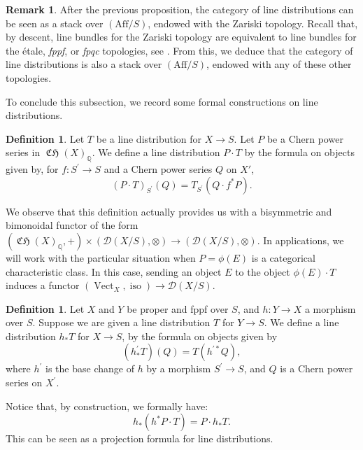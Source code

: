 \documentclass[JEP,XML,SOM,Unicode,published]{cedram}
\theoremstyle{plain}
\theoremstyle{definition}
\newtheorem{definition}[theorem]{Definition}
\newtheorem{remark}[theorem]{Remark}
\newcommand{\QBbb}{\mathbb Q}
\newcommand{\Dcal}{\mathcal D}
\newcommand{\fppf}{\emph{fppf}\xspace}
\DeclareMathOperator{\CHfrak}{\mathfrak{CH}}
\DeclareMathOperator{\iso}{iso}
\DeclareMathOperator{\Vect}{Vect}
\begin{document}
\begin{remark}
After the previous proposition, the category of line distributions can be seen as a stack over $(\mathrm{Aff}/S)$, endowed with the Zariski topology. Recall that, by descent, line bundles for the Zariski topology are equivalent to line bundles for the étale, \fppf, or \emph{fpqc} topologies, see \cite[\href{https://stacks.math.columbia.edu/tag/03P7}{03P7}]{stacks-project}. From this, we deduce that the category of line distributions is also a stack over $(\mathrm{Aff}/S)$, endowed with any of these other topologies.
\end{remark}

To conclude this subsection, we record some formal constructions on line distributions.
\begin{definition}\label{def:prod-Chern-series-line-distribution}
Let $T$ be a line distribution for $X\to S$. Let $P$ be a Chern power series in $\CHfrak(X)_{\QBbb}$. We define a line distribution $P \cdot T$ by the formula on objects given by, for $f: S^{\prime} \to S$ and a Chern power series $Q$ on $X'$,
\begin{displaymath}
(P \cdot T)_{S^{\prime}}(Q) = T_{S^{\prime}}(Q\cdot f^\ast P).
\end{displaymath}
\end{definition}
We observe that this definition actually provides us with a bisymmetric and bimonoidal functor of the form $(\CHfrak(X)_{\QBbb}, +)\times(\Dcal(X/S),\otimes) \to (\Dcal(X/S),\otimes)$. In appli\-cations, we will work with the particular situation when $P=\phi(E)$ is a categorical characteristic class. In this case, sending an object $E$ to the object $\phi(E)\cdot T$ induces a functor $(\Vect_{X},\iso)\to\Dcal(X/S)$.

\begin{definition}\label{def:direct-image-distributions}
Let $X$ and $Y$ be proper and fppf over $S$, and $h\colon Y\to X$ a morphism over $S$. Suppose we are given a line distribution $T$ for $Y\to S$. We define a line distribution $h_\ast T$ for $X\to S$, by the formula on objects given by
\begin{displaymath}
(h_\ast^{\prime} T)(Q)= T(h^{\prime\ast} Q),
\end{displaymath}
where $h^{\prime}$ is the base change of $h$ by a morphism $S^{\prime}\to S$, and $Q$ is a Chern power series on $X^{\prime}$.
\end{definition}

Notice that, by construction, we formally have:
\begin{equation}\label{linedist:projformula}
h_\ast \left( h^\ast P \cdot T \right) = P \cdot h_\ast T.
\end{equation}
This can be seen as a projection formula for line distributions.
\end{document}
